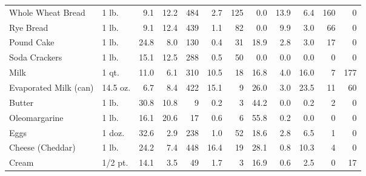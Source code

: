 \documentclass[
  ignorenonframetext,
]{beamer}
\begin{document}
\begin{frame}[fragile]
\begin{tabular}{llrrrrrrrrrr}
Whole Wheat Bread       &       1 lb. &                 9.1 &      12.2 &          484 &          2.7 &        125 &             0.0 &           13.9 &              6.4 &          160 &                   0 \\
Rye Bread               &       1 lb. &                 9.1 &      12.4 &          439 &          1.1 &         82 &             0.0 &            9.9 &              3.0 &           66 &                   0 \\
Pound Cake              &       1 lb. &                24.8 &       8.0 &          130 &          0.4 &         31 &            18.9 &            2.8 &              3.0 &           17 &                   0 \\
Soda Crackers           &       1 lb. &                15.1 &      12.5 &          288 &          0.5 &         50 &             0.0 &            0.0 &              0.0 &            0 &                   0 \\
Milk                    &       1 qt. &                11.0 &       6.1 &          310 &         10.5 &         18 &            16.8 &            4.0 &             16.0 &            7 &                 177 \\
Evaporated Milk (can)   &    14.5 oz. &                 6.7 &       8.4 &          422 &         15.1 &          9 &            26.0 &            3.0 &             23.5 &           11 &                  60 \\
Butter                  &       1 lb. &                30.8 &      10.8 &            9 &          0.2 &          3 &            44.2 &            0.0 &              0.2 &            2 &                   0 \\
Oleomargarine           &       1 lb. &                16.1 &      20.6 &           17 &          0.6 &          6 &            55.8 &            0.2 &              0.0 &            0 &                   0 \\
Eggs                    &      1 doz. &                32.6 &       2.9 &          238 &          1.0 &         52 &            18.6 &            2.8 &              6.5 &            1 &                   0 \\
Cheese (Cheddar)        &       1 lb. &                24.2 &       7.4 &          448 &         16.4 &         19 &            28.1 &            0.8 &             10.3 &            4 &                   0 \\
Cream                   &     1/2 pt. &                14.1 &       3.5 &           49 &          1.7 &          3 &            16.9 &            0.6 &              2.5 &            0 &                  17 \\

\end{tabular}
\end{frame}
\end{document}

